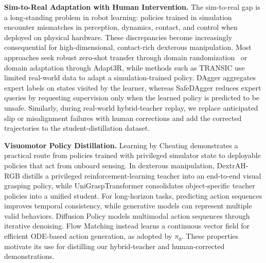 \textbf{Sim-to-Real Adaptation with Human Intervention.}
The sim-to-real gap is a long-standing problem in robot learning: policies
trained in simulation encounter mismatches in perception, dynamics, contact,
and control when deployed on physical hardware. These discrepancies become
increasingly consequential for high-dimensional, contact-rich dexterous
manipulation. Most approaches seek robust zero-shot transfer through domain
randomization~\cite{tobin2017domain} or domain adaptation through
Adapt3R\cite{wilcox2025adapt3r}, while methods such as
TRANSIC\cite{jiang2025transic} use limited real-world data to adapt a
simulation-trained policy. DAgger\cite{ross2011reduction} aggregates expert
labels on states visited by the learner, whereas
SafeDAgger\cite{zhang2016safedagger} reduces expert queries by requesting
supervision only when the learned policy is predicted to be unsafe. Similarly,
during real-world hybrid-teacher replay, we
replace anticipated slip or misalignment failures with human corrections and
add the corrected trajectories to the student-distillation dataset.

\textbf{Visuomotor Policy Distillation.}
Learning by Cheating\cite{chen2020cheating} demonstrates a practical route from
policies trained with privileged simulator state to deployable policies that
act from onboard sensing. In dexterous manipulation,
DextrAH-RGB\cite{dextrahrgb} distills a privileged reinforcement-learning
teacher into an end-to-end visual grasping policy, while
UniGraspTransformer\cite{wang2025unigrasp} consolidates object-specific teacher
policies into a unified student.
For long-horizon tasks, predicting action sequences improves temporal
consistency, while generative models can represent multiple valid behaviors.
Diffusion Policy\cite{chi2023diffusion} models multimodal action sequences
through iterative denoising. Flow Matching\cite{lipman2023flow} instead learns a
continuous vector field for efficient ODE-based action generation, as adopted
by $\pi_0$\cite{black2024pi0}. These properties motivate its use for
distilling our hybrid-teacher and human-corrected demonstrations.
